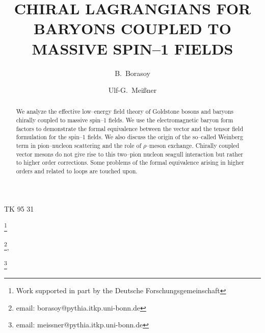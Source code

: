 

\newcommand{\krig}[1]{\stackrel{\circ}{#1}}



\hfill TK 95 31

\bigskip %

\begin{frontmatter}
\title{CHIRAL LAGRANGIANS FOR BARYONS COUPLED
  TO MASSIVE SPIN--1 FIELDS }
\thanks[dfg]{Work supported in part by the Deutsche Forschungsgemeinschaft}


\author[Bonn]{B.~Borasoy}\footnote{email: borasoy@pythia.itkp.uni-bonn.de},
\author[Bonn]{Ulf-G.~Mei\ss ner}\footnote{email:
                                          meissner@pythia.itkp.uni-bonn.de}


\address[Bonn]{Institut f\"ur Theoretische Kernphysik, Universit\"at
  Bonn\\ Nu\ss allee 14--16, D-53115 Bonn,  Germany}


\begin{abstract}
We analyze the effective low--energy field theory of Goldstone bosons
and  baryons chirally coupled to massive spin--1 fields. We use
the electromagnetic baryon form factors to demonstrate the formal
equivalence between the vector and the tensor field formulation for
the spin--1 fields. We also discuss the origin of the so--called
Weinberg term in pion--nucleon scattering and the role of
$\rho$--meson exchange. Chirally coupled vector mesons do not give
rise to this two--pion nucleon seagull interaction but rather to
higher order corrections.  Some problems of the formal equivalence
arising in higher orders and related to loops are touched upon.
\end{abstract}

\end{frontmatter}

